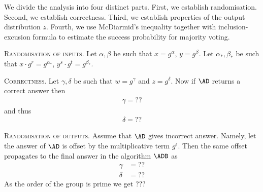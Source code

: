 \documentclass{crypto-exercise}
\begin{document}
\begin{solution}
We divide the analysis into four distinct parts. First, we establish randomisation. Second, we establish correctness. Third, we establish properties of the output distribution $z$. Fourth, we use 
McDiarmid's inequality together with inclusion-excusion formula to estimate the success probability for majority voting.
  
\vspace*{2ex}
\noindent\textsc{Randomisation of inputs.}
Let $\alpha,\beta$ be such that $x=g^\alpha$, $y=g^\beta$. 
Let $\alpha_*, \beta_*$ be such that $x\cdot g^r=g^{\alpha_*}$, $y^s\cdot g^t=g^{\beta_*}$.  


\vspace*{2ex}
\noindent\textsc{Correctness.}
Let $\gamma,\delta$ be such that $w=g^\gamma$ and $z=g^\delta$. 
Now if $\AD$ returns a correct answer then 
\begin{align*}
\gamma=??
\end{align*}
and thus 
\begin{align*}
\delta=??
\end{align*}

\vspace*{2ex}
\noindent\textsc{Randomisation of outputs.}
Assume that $\AD$ gives incorrect answer. 
Namely, let the answer of $\AD$ is offset by the multiplicative term $g^\epsilon$. Then the same offset propagates to the final answer in the algorithm $\ADB$ as
\begin{align*}
\gamma&=??\\
\delta&=??
\end{align*} 
As the order of the group is prime we get ???



\end{solution}
\end{document}
